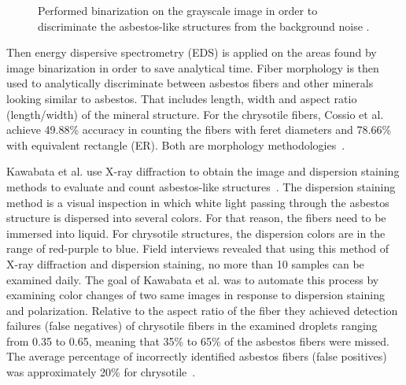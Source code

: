 \begin{figure}[h]
\centering
\caption{Performed binarization on the grayscale image in order to discriminate the asbestos-like structures from the background noise \cite{cossio2018innovative}. }
\label{fig:binarization}
\end{figure}

\quad

Then energy dispersive  spectrometry (EDS) is applied on the areas found by image binarization in order to save analytical time. Fiber morphology is then used to analytically discriminate between asbestos fibers and other minerals looking similar to asbestos. That includes length, width and aspect ratio (length/width) of the mineral structure. For the chrysotile fibers, Cossio et al. achieve 49.88\% accuracy in counting the fibers with feret diameters and 78.66\% with equivalent rectangle (ER). Both are morphology methodologies~\cite{cossio2018innovative}.

Kawabata et al. use X-ray diffraction to obtain the image and dispersion staining methods to evaluate and count asbestos-like structures~\cite{kawabata2009asbestos}. The dispersion staining method is a visual inspection in which white light passing through the asbestos structure is dispersed into several colors. For that reason, the fibers need to be immersed into liquid. For chrysotile structures, the dispersion colors are in the range of red-purple to blue. Field interviews revealed that using this method of X-ray diffraction and dispersion staining, no more than 10 samples can be examined daily. The goal of Kawabata et al. was to automate this process by examining color changes of two same images in response to dispersion staining and polarization. Relative to the aspect ratio of the fiber they achieved detection failures (false negatives) of chrysotile fibers in the examined droplets ranging from 0.35 to 0.65, meaning that 35\% to 65\% of the asbestos fibers were missed. The average percentage of incorrectly identified asbestos fibers (false positives) was approximately 20\% for chrysotile~\cite{kawabata2009asbestos}. 


